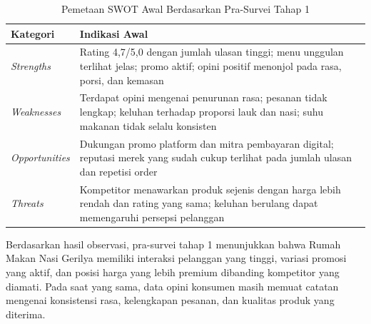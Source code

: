 \begin{table}[h!]
    \centering
    \caption{Pemetaan SWOT Awal Berdasarkan Pra-Survei Tahap 1}
    \label{tab:swot_prasurvey1}
    \begin{tabularx}{\textwidth}{lY}
        \toprule
        \textbf{Kategori}      & \textbf{Indikasi Awal}                                                                                                                      \\
        \midrule
        \textit{Strengths}     & Rating 4,7/5,0 dengan jumlah ulasan tinggi; menu unggulan terlihat jelas; promo aktif; opini positif menonjol pada rasa, porsi, dan kemasan \\
        \textit{Weaknesses}    & Terdapat opini mengenai penurunan rasa; pesanan tidak lengkap; keluhan terhadap proporsi lauk dan nasi; suhu makanan tidak selalu konsisten \\
        \textit{Opportunities} & Dukungan promo platform dan mitra pembayaran digital; reputasi merek yang sudah cukup terlihat pada jumlah ulasan dan repetisi order        \\
        \textit{Threats}       & Kompetitor menawarkan produk sejenis dengan harga lebih rendah dan rating yang sama; keluhan berulang dapat memengaruhi persepsi pelanggan  \\
        \bottomrule
    \end{tabularx}
\end{table}

\FloatBarrier
Berdasarkan hasil observasi, pra-survei tahap 1 menunjukkan bahwa Rumah Makan Nasi Gerilya memiliki interaksi pelanggan yang tinggi, variasi promosi yang aktif, dan posisi harga yang lebih premium dibanding kompetitor yang diamati. Pada saat yang sama, data opini konsumen masih memuat catatan mengenai konsistensi rasa, kelengkapan pesanan, dan kualitas produk yang diterima.




